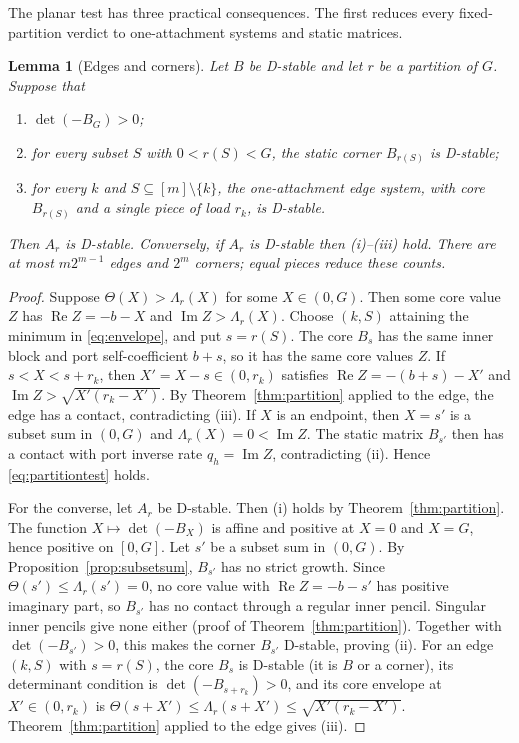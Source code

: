 \documentclass[11pt,a4paper]{article}
\theoremstyle{plain}
\newtheorem{lemma}[theorem]{Lemma}
\theoremstyle{definition}
\theoremstyle{remark}
\newcommand{\Real}{\operatorname{Re}}
\newcommand{\Imag}{\operatorname{Im}}
\newcommand{\Env}{\Lambda}
\newcommand{\Core}{\Theta}
\begin{document}
The planar test has three practical consequences. The first reduces every
fixed-partition verdict to one-attachment systems and static matrices.

\begin{lemma}[Edges and corners]\label{lem:edges}
Let $B$ be D-stable and let $r$ be a partition of $G$. Suppose that
\begin{enumerate}[label=(\roman*)]
\item $\det(-B_G)>0$;
\item for every subset $S$ with $0<r(S)<G$, the static \emph{corner}
$B_{r(S)}$ is D-stable;
\item for every $k$ and $S\subseteq[m]\setminus\{k\}$, the one-attachment
\emph{edge} system, with core $B_{r(S)}$ and a single piece of load $r_k$, is
D-stable.
\end{enumerate}
Then $A_r$ is D-stable. Conversely, if $A_r$ is D-stable then (i)--(iii)
hold. There are at most $m2^{m-1}$ edges and $2^m$ corners; equal pieces
reduce these counts.
\end{lemma}
\begin{proof}
Suppose $\Core(X)>\Env_r(X)$ for some $X\in(0,G)$. Then some core value $Z$
has $\Real Z=-b-X$ and $\Imag Z>\Env_r(X)$. Choose $(k,S)$ attaining the
minimum in \eqref{eq:envelope}, and put $s=r(S)$. The core $B_s$ has the same
inner block and port self-coefficient $b+s$, so it has the same core values
$Z$. If $s<X<s+r_k$, then $X'=X-s\in(0,r_k)$ satisfies
$\Real Z=-(b+s)-X'$ and $\Imag Z>\sqrt{X'(r_k-X')}$. By
Theorem~\ref{thm:partition} applied to the edge, the edge has a contact,
contradicting (iii). If $X$ is an endpoint, then $X=s'$ is a subset sum in
$(0,G)$ and $\Env_r(X)=0<\Imag Z$. The static matrix $B_{s'}$ then has a
contact with port inverse rate $q_h=\Imag Z$, contradicting
(ii). Hence \eqref{eq:partitiontest} holds.

For the converse, let $A_r$ be D-stable. Then (i) holds by
Theorem~\ref{thm:partition}. The function $X\mapsto\det(-B_X)$ is affine and
positive at $X=0$ and $X=G$, hence positive on $[0,G]$. Let $s'$ be a subset sum
in $(0,G)$. By Proposition~\ref{prop:subsetsum}, $B_{s'}$ has no strict growth.
Since $\Core(s')\le\Env_r(s')=0$, no core value with $\Real Z=-b-s'$ has
positive imaginary part, so $B_{s'}$ has no contact through a regular inner
pencil. Singular inner pencils give none either (proof of
Theorem~\ref{thm:partition}). Together with $\det(-B_{s'})>0$, this makes the
corner $B_{s'}$ D-stable, proving (ii). For an edge $(k,S)$ with $s=r(S)$, the
core $B_s$ is D-stable (it is $B$ or a corner), its determinant condition is
$\det(-B_{s+r_k})>0$, and its core envelope at $X'\in(0,r_k)$ is
$\Core(s+X')\le\Env_r(s+X')\le\sqrt{X'(r_k-X')}$. Theorem~\ref{thm:partition}
applied to the edge gives (iii).
\end{proof}
\end{document}
